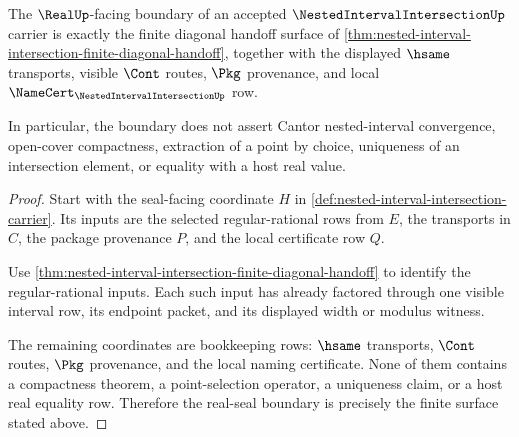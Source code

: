 \begin{theorem}
\label{thm:nested-interval-intersection-real-seal-boundary}
The $\RealUp$-facing boundary of an accepted $\NestedIntervalIntersectionUp$ carrier is exactly the finite diagonal handoff surface of \autoref{thm:nested-interval-intersection-finite-diagonal-handoff}, together with the displayed $\hsame$ transports, visible $\Cont$ routes, $\Pkg$ provenance, and local $\NameCert_{\NestedIntervalIntersectionUp}$ row.

In particular, the boundary does not assert Cantor nested-interval convergence, open-cover compactness, extraction of a point by choice, uniqueness of an intersection element, or equality with a host real value.
\end{theorem}
\begin{proof}
Start with the seal-facing coordinate $H$ in \autoref{def:nested-interval-intersection-carrier}. Its inputs are the selected regular-rational rows from $E$, the transports in $C$, the package provenance $P$, and the local certificate row $Q$.

Use \autoref{thm:nested-interval-intersection-finite-diagonal-handoff} to identify the regular-rational inputs. Each such input has already factored through one visible interval row, its endpoint packet, and its displayed width or modulus witness.

The remaining coordinates are bookkeeping rows: $\hsame$ transports, $\Cont$ routes, $\Pkg$ provenance, and the local naming certificate. None of them contains a compactness theorem, a point-selection operator, a uniqueness claim, or a host real equality row. Therefore the real-seal boundary is precisely the finite surface stated above.
\end{proof}

